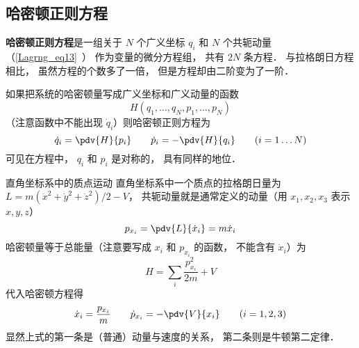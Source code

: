 \subsection{哈密顿正则方程}
\textbf{哈密顿正则方程}是一组关于 $N$ 个广义坐标 $q_i$ 和 $N$ 个共轭动量（\autoref{Lagrng_eq13}~） 作为变量的微分方程组， 共有 $2N$ 条方程． 与拉格朗日方程相比， 虽然方程的个数多了一倍， 但是方程却由二阶变为了一阶．

如果把系统的哈密顿量写成广义坐标和广义动量的函数
\begin{equation}
H(q_1,\dots, q_N, p_1,\dots, p_N)
\end{equation}
（注意函数中不能出现 $\dot q_i$）则哈密顿正则方程为
\begin{equation}\label{HamCan_eq2}
\dot q_i = \pdv{H}{p_i}
\qquad
\dot p_i = -\pdv{H}{q_i}
\qquad
(i = 1\dots N)
\end{equation}
可见在方程中， $q_i$ 和 $p_i$ 是对称的， 具有同样的地位．

\begin{example}{直角坐标系中的质点运动}
直角坐标系中一个质点的拉格朗日量为 $L = m(\dot x^2 + \dot y^2 + \dot z^2)/2 - V$， 共轭动量就是通常定义的动量（用 $x_1,x_2,x_3$ 表示 $x, y, z$）
\begin{equation}
p_{x_i} = \pdv{L}{\dot x_i} = m\dot x_i
\end{equation}
哈密顿量等于总能量（注意要写成 $x_i$ 和 $p_{x_i}$ 的函数， 不能含有 $\dot x_i$）为
\begin{equation}
H = \sum_i \frac{p_{x_i}^2}{2m} + V
\end{equation}
代入哈密顿方程得
\begin{equation}
\dot x_i = \frac{p_{x_i}}{m}
\qquad
\dot p_{x_i} = -\pdv{V}{x_i}
\qquad (i = 1,2,3)
\end{equation}
显然上式的第一条是（普通）动量与速度的关系， 第二条则是牛顿第二定律．
\end{example}

